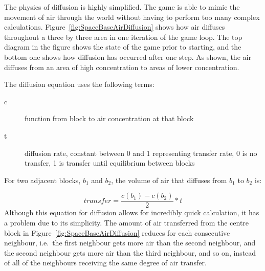 The physics of diffusion is highly simplified. The game is able to mimic the movement of air through the world without having to perform too many complex calculations. Figure~\ref{fig:SpaceBaseAirDiffusion} shows how air diffuses throughout a three by three area in one iteration of the game loop. The top diagram in the figure shows the state of the game prior to starting, and the bottom one shows how diffusion has occurred after one step. As shown, the air diffuses from an area of high concentration to areas of lower concentration.

The diffusion equation uses the following terms:
\begin{description}
\item[c] function from block to air concentration at that block
\item[t] diffusion rate, constant between 0 and 1 representing transfer rate, 0 is no transfer, 1 is transfer until equilibrium between blocks
\end{description}
\noindent
For two adjacent blocks, $b_1$ and $b_2$, the volume of air that diffuses from $b_1$ to $b_2$ is:

$$ transfer = \frac{c(b_1) - c(b_2)}{2} * t $$
\noindent
Although this equation for diffusion allows for incredibly quick calculation, it has a problem due to its simplicity. The amount of air transferred from the centre block in Figure~\ref{fig:SpaceBaseAirDiffusion} reduces for each consecutive neighbour, i.e.\ the first neighbour gets more air than the second neighbour, and the second neighbour gets more air than the third neighbour, and so on, instead of all of the neighbours receiving the same degree of air transfer.


